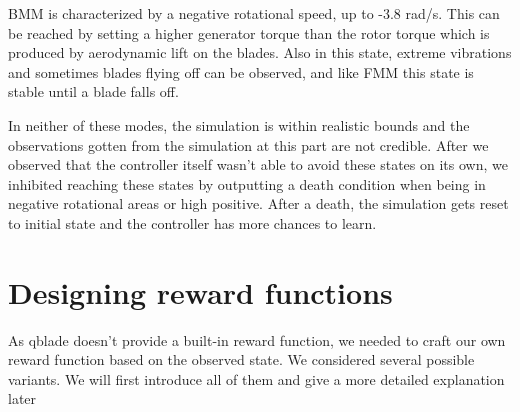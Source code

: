 \documentclass[hyperref,german,beleg]{cgvpub}
\begin{document}
\ac{BMM} is characterized by a negative rotational speed, up to -3.8 rad/s. This can be reached by setting a higher generator torque than the rotor torque which is produced by aerodynamic lift on the blades. Also in this state, extreme vibrations and sometimes blades flying off can be observed, and like \ac{FMM} this state is stable until a blade falls off. 

In neither of these modes, the simulation is within realistic bounds and the observations gotten from the simulation at this part are not credible. After we observed that the controller itself wasn't able to avoid these states on its own, we inhibited reaching these states by outputting a death condition when being in negative rotational areas or high positive. After a death, the simulation gets reset to initial state and the controller has more chances to learn.


\section{Designing reward functions}
\label{rewardfunctions}

As qblade doesn't provide a built-in reward function, we needed to craft our own reward function based on the observed state. We considered several possible variants. We will first introduce all of them and give a more detailed explanation later
\end{document}
